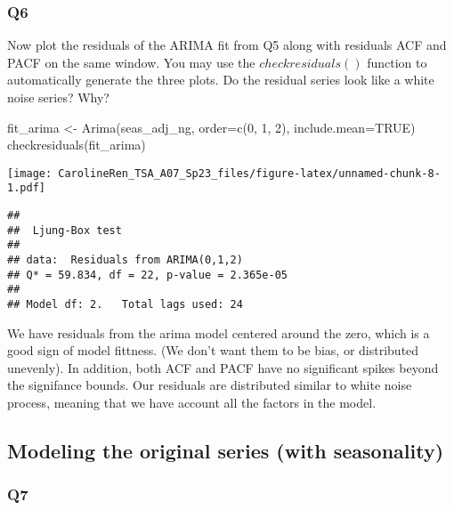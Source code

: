 \documentclass[
]{article}
\newenvironment{Shaded}{\begin{snugshade}}{\end{snugshade}}
\newcommand{\AttributeTok}[1]{\textcolor[rgb]{0.77,0.63,0.00}{#1}}
\newcommand{\ConstantTok}[1]{\textcolor[rgb]{0.00,0.00,0.00}{#1}}
\newcommand{\DecValTok}[1]{\textcolor[rgb]{0.00,0.00,0.81}{#1}}
\newcommand{\FunctionTok}[1]{\textcolor[rgb]{0.00,0.00,0.00}{#1}}
\newcommand{\NormalTok}[1]{#1}
\newcommand{\OtherTok}[1]{\textcolor[rgb]{0.56,0.35,0.01}{#1}}
\begin{document}
\hypertarget{q6}{%
\subsubsection{Q6}\label{q6}}

Now plot the residuals of the ARIMA fit from Q5 along with residuals ACF
and PACF on the same window. You may use the \(checkresiduals()\)
function to automatically generate the three plots. Do the residual
series look like a white noise series? Why?

\begin{Shaded}
\begin{Highlighting}[]
\NormalTok{fit\_arima }\OtherTok{\textless{}{-}} \FunctionTok{Arima}\NormalTok{(seas\_adj\_ng, }\AttributeTok{order=}\FunctionTok{c}\NormalTok{(}\DecValTok{0}\NormalTok{, }\DecValTok{1}\NormalTok{, }\DecValTok{2}\NormalTok{), }\AttributeTok{include.mean=}\ConstantTok{TRUE}\NormalTok{)}
\FunctionTok{checkresiduals}\NormalTok{(fit\_arima)}
\end{Highlighting}
\end{Shaded}

\texttt{[image: CarolineRen\_TSA\_A07\_Sp23\_files/figure-latex/unnamed-chunk-8-1.pdf]}

\begin{verbatim}
## 
##  Ljung-Box test
## 
## data:  Residuals from ARIMA(0,1,2)
## Q* = 59.834, df = 22, p-value = 2.365e-05
## 
## Model df: 2.   Total lags used: 24
\end{verbatim}

We have residuals from the arima model centered around the zero, which
is a good sign of model fittness. (We don't want them to be bias, or
distributed unevenly). In addition, both ACF and PACF have no
significant spikes beyond the signifance bounds. Our residuals are
distributed similar to white noise process, meaning that we have account
all the factors in the model.

\hypertarget{modeling-the-original-series-with-seasonality}{%
\subsection{Modeling the original series (with
seasonality)}\label{modeling-the-original-series-with-seasonality}}

\hypertarget{q7}{%
\subsubsection{Q7}\label{q7}}
\end{document}
